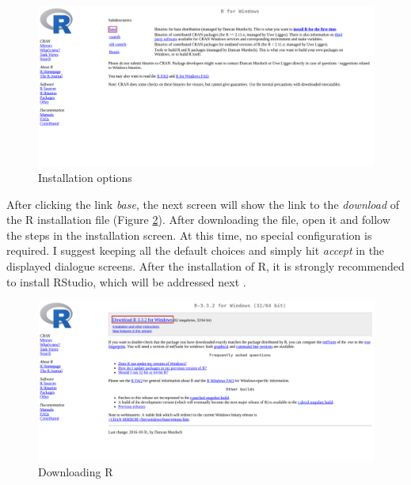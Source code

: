 \documentclass[11pt,]{book}
\begin{document}
\begin{figure}[!htbp]

{\centering \includegraphics[width=1\linewidth]{figs/website_cran_4} 

}

\caption{Installation options}\label{fig:website-cran-4}
\end{figure}

After clicking the link \emph{base}, the next screen will show the link
to the \emph{download} of the R installation file (Figure
\ref{fig:website-cran-5}). After downloading the file, open it and
follow the steps in the installation screen. At this time, no special
configuration is required. I suggest keeping all the default choices and
simply hit \emph{accept} in the displayed dialogue screens. After the
installation of R, it is strongly recommended to install RStudio, which
will be addressed next .

\begin{figure}[!htbp]

{\centering \includegraphics[width=1\linewidth]{figs/website_cran_5} 

}

\caption{Downloading R}\label{fig:website-cran-5}
\end{figure}
\end{document}
